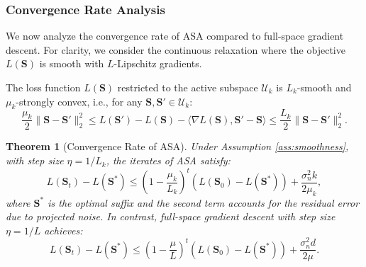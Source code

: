 \documentclass[preprint,12pt]{elsarticle}
\newtheorem{theorem}{Theorem}[section]
\begin{document}
\subsubsection{Convergence Rate Analysis}
\label{sec:convergence}

We now analyze the convergence rate of ASA compared to full-space gradient descent. For clarity, we consider the continuous relaxation where the objective $L(\mathbf{S})$ is smooth with $L$-Lipschitz gradients.

\begin{assumption}
\label{ass:smoothness}
The loss function $L(\mathbf{S})$ restricted to the active subspace $\mathcal{U}_k$ is $L_k$-smooth and $\mu_k$-strongly convex, i.e., for any $\mathbf{S}, \mathbf{S}' \in \mathcal{U}_k$:
\begin{equation}
\frac{\mu_k}{2} \|\mathbf{S} - \mathbf{S}'\|_2^2 \leq L(\mathbf{S}') - L(\mathbf{S}) - \langle \nabla L(\mathbf{S}), \mathbf{S}' - \mathbf{S} \rangle \leq \frac{L_k}{2} \|\mathbf{S} - \mathbf{S}'\|_2^2.
\end{equation}
\end{assumption}

\begin{theorem}[Convergence Rate of ASA]
\label{thm:convergence}
Under Assumption \ref{ass:smoothness}, with step size $\eta = 1/L_k$, the iterates of ASA satisfy:
\begin{equation}
\label{eq:convergence_rate}
L(\mathbf{S}_t) - L(\mathbf{S}^*) \leq \left(1 - \frac{\mu_k}{L_k}\right)^t \left(L(\mathbf{S}_0) - L(\mathbf{S}^*)\right) + \frac{\sigma_n^2 k}{2 \mu_k},
\end{equation}
where $\mathbf{S}^*$ is the optimal suffix and the second term accounts for the residual error due to projected noise. In contrast, full-space gradient descent with step size $\eta = 1/L$ achieves:
\begin{equation}
\label{eq:full_convergence}
L(\mathbf{S}_t) - L(\mathbf{S}^*) \leq \left(1 - \frac{\mu}{L}\right)^t \left(L(\mathbf{S}_0) - L(\mathbf{S}^*)\right) + \frac{\sigma_n^2 d}{2 \mu}.
\end{equation}
\end{theorem}
\end{document}
